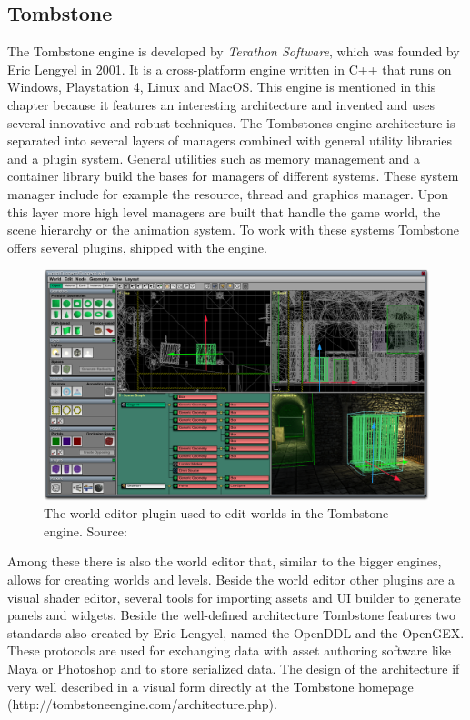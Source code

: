 \subsection{Tombstone}

The Tombstone engine is developed by \textit{Terathon Software}, which was founded by Eric Lengyel in 2001. It is a cross-platform engine written in C++ that runs on Windows, Playstation 4, Linux and MacOS. This engine is mentioned in this chapter because it features an interesting architecture and invented and uses several innovative and robust techniques.
The Tombstones engine architecture is separated into several layers of managers combined with general utility libraries and a plugin system. General utilities such as memory management and a container library build the bases for managers of different systems. These system manager include for example the resource, thread and graphics manager. Upon this layer more high level managers are built that handle the game world, the scene hierarchy or the animation system. To work with these systems Tombstone offers several plugins, shipped with the engine.

 \begin{figure}[h!]
 	\centering \includegraphics[width=0.5 \linewidth]{PICs/tombstone_ed.png}
 	\caption{The world editor plugin used to edit worlds in the Tombstone engine. Source: \cite{Tombstone}}
 	\label{fig:tombstone_ed}
 \end{figure}

Among these there is also the world editor that, similar to the bigger engines, allows for creating worlds and levels. Beside the world editor other plugins are a visual shader editor, several tools for importing assets and \ac{UI} builder to generate panels and widgets. Beside the well-defined architecture Tombstone features two standards also created by Eric Lengyel, named the \ac{OpenDDL} and the \ac{OpenGEX}. These protocols are used for exchanging data with asset authoring software like Maya or Photoshop and to store serialized data. The design of the architecture if very well described in a visual form directly at the Tombstone homepage (http://tombstoneengine.com/architecture.php).

